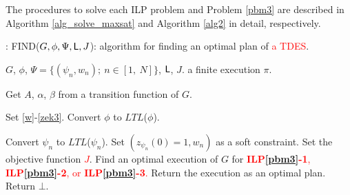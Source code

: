 \documentclass[journal,twoside,web]{IEEEtran}
\newcommand{\req}[1]{\eqref{#1}}
\newcommand{\Len}{{\sf L}}
\newcommand{\red}[1]{\textcolor{red}{#1}}
\begin{document}
The procedures to solve each ILP problem and Problem \ref{pbm3} are described in Algorithm \ref{alg_solve_maxsat} and Algorithm \ref{alg2} in detail, respectively.
%

%
%
\begin{algorithm}
\caption{: FIND($G,\phi,\Psi,\Len,J$): algorithm for finding an optimal plan of \red{a TDES}. } \label{alg_solve_maxsat}
\begin{algorithmic}
%
\Require $G$, $\phi$, $\Psi=\{(\psi_n,{w_n});\ n\in[1,\ N]\}$, $\Len$, $J$.
\Ensure a finite execution $\pi$.

\State Get $A$, $\alpha$, $\beta$ from a transition function of $G$.

\State Set \req{w}-\req{zek3}.
\State Convert $\phi$ to $LTL$($\phi$).

	\State Convert $\psi_n$ to $LTL$($\psi_n$).
	\State Set $(z_{\psi_n}(0)=1,{w_n})$ as a soft constraint.
	\EndFor
\EndIf
\State Set the objective function \red{$J$}.
\State Find an optimal execution of $G$ for \red{{\bf ILP\ref{pbm3}-1}, {\bf ILP\ref{pbm3}-2}, or {\bf ILP\ref{pbm3}-3}.}
	\State Return the execution as an optimal plan.
\Else
	\State  Return $\bot$.
\EndIf
\end{algorithmic}
\end{algorithm}
%
\end{document}

